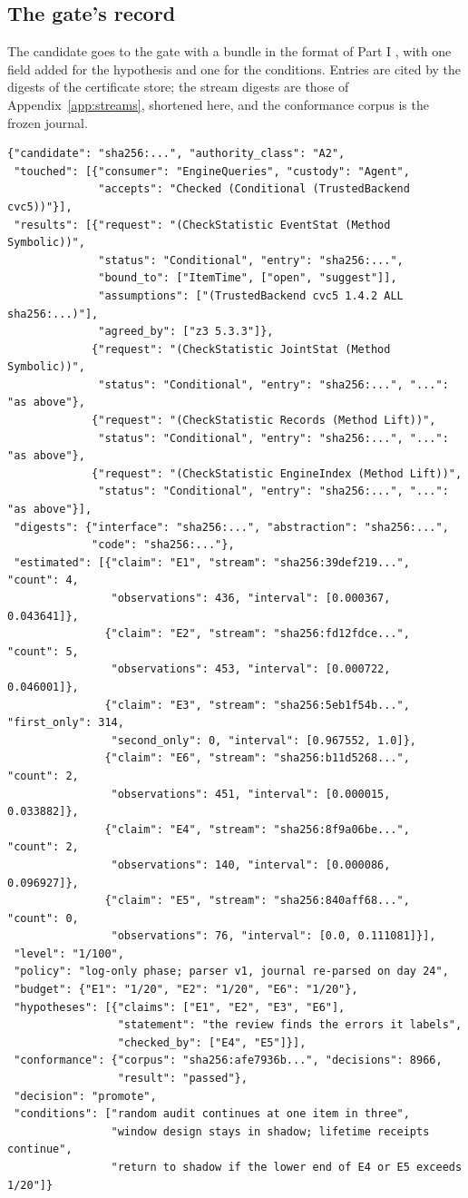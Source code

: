 \documentclass[11pt]{article}
\theoremstyle{definition}
\theoremstyle{plain}
\begin{document}
\subsection{The gate's record}\label{sec:bundle}

The candidate goes to the gate with a bundle in the format of Part I \cite[Appendix~C.6]{part1},
with one field added for the hypothesis and one for the conditions. Entries are cited by the
digests of the certificate store; the stream digests are those of Appendix~\ref{app:streams},
shortened here, and the conformance corpus is the frozen journal.
\begin{lstlisting}
{"candidate": "sha256:...", "authority_class": "A2",
 "touched": [{"consumer": "EngineQueries", "custody": "Agent",
              "accepts": "Checked (Conditional (TrustedBackend cvc5))"}],
 "results": [{"request": "(CheckStatistic EventStat (Method Symbolic))",
              "status": "Conditional", "entry": "sha256:...",
              "bound_to": ["ItemTime", ["open", "suggest"]],
              "assumptions": ["(TrustedBackend cvc5 1.4.2 ALL sha256:...)"],
              "agreed_by": ["z3 5.3.3"]},
             {"request": "(CheckStatistic JointStat (Method Symbolic))",
              "status": "Conditional", "entry": "sha256:...", "...": "as above"},
             {"request": "(CheckStatistic Records (Method Lift))",
              "status": "Conditional", "entry": "sha256:...", "...": "as above"},
             {"request": "(CheckStatistic EngineIndex (Method Lift))",
              "status": "Conditional", "entry": "sha256:...", "...": "as above"}],
 "digests": {"interface": "sha256:...", "abstraction": "sha256:...",
             "code": "sha256:..."},
 "estimated": [{"claim": "E1", "stream": "sha256:39def219...", "count": 4,
                "observations": 436, "interval": [0.000367, 0.043641]},
               {"claim": "E2", "stream": "sha256:fd12fdce...", "count": 5,
                "observations": 453, "interval": [0.000722, 0.046001]},
               {"claim": "E3", "stream": "sha256:5eb1f54b...", "first_only": 314,
                "second_only": 0, "interval": [0.967552, 1.0]},
               {"claim": "E6", "stream": "sha256:b11d5268...", "count": 2,
                "observations": 451, "interval": [0.000015, 0.033882]},
               {"claim": "E4", "stream": "sha256:8f9a06be...", "count": 2,
                "observations": 140, "interval": [0.000086, 0.096927]},
               {"claim": "E5", "stream": "sha256:840aff68...", "count": 0,
                "observations": 76, "interval": [0.0, 0.111081]}],
 "level": "1/100",
 "policy": "log-only phase; parser v1, journal re-parsed on day 24",
 "budget": {"E1": "1/20", "E2": "1/20", "E6": "1/20"},
 "hypotheses": [{"claims": ["E1", "E2", "E3", "E6"],
                 "statement": "the review finds the errors it labels",
                 "checked_by": ["E4", "E5"]}],
 "conformance": {"corpus": "sha256:afe7936b...", "decisions": 8966,
                 "result": "passed"},
 "decision": "promote",
 "conditions": ["random audit continues at one item in three",
                "window design stays in shadow; lifetime receipts continue",
                "return to shadow if the lower end of E4 or E5 exceeds 1/20"]}
\end{lstlisting}
\end{document}
